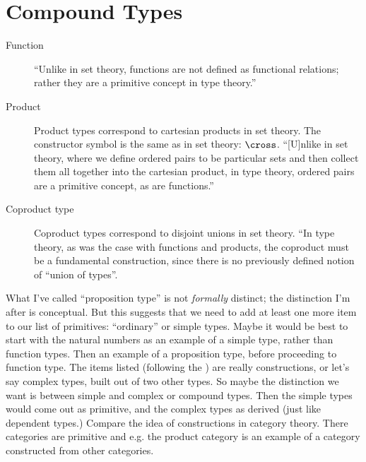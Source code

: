 \section{Compound Types}
\label{subs:compountypes}

\begin{description}
\item [Function] ``Unlike in set theory, functions are not defined as
  functional relations; rather they are a primitive concept in type
  theory.'' \citep[p. 21]{hottbook}

\item [Product] Product types correspond to cartesian products in set
  theory.  The constructor symbol is the same as in set theory:
  \(\cross\).
  ``[U]nlike in set theory, where we define ordered pairs to be
  particular sets and then collect them all together into the
  cartesian product, in type theory, ordered pairs are a primitive
  concept, as are functions.''\citep[p. 26]{hottbook}

\item [Coproduct type] Coproduct types correspond to disjoint unions
  in set theory.  ``In type theory, as was the case with functions and
  products, the coproduct must be a fundamental construction, since
  there is no previously defined notion of ``union of
  types''.\citep[p. 33]{hottbook}

\end{description}

\begin{ednote}
  What I've called ``proposition type'' is not \textit{formally}
  distinct; the distinction I'm after is conceptual.  But this
  suggests that we need to add at least one more item to our list of
  primitives: ``ordinary'' or simple types.  Maybe it would be best to
  start with the natural numbers as an example of a simple type,
  rather than function types.  Then an example of a proposition type,
  before proceeding to function type.  The items listed (following the
  \HoTTB{}) are really constructions, or let's say complex types,
  built out of two other types.  So maybe the distinction we want is
  between simple and complex or compound types.  Then the simple types
  would come out as primitive, and the complex types as derived (just
  like dependent types.)  Compare the idea of constructions in
  category theory.  There categories are primitive and e.g. the
  product category is an example of a category constructed from other
  categories.
\end{ednote}

